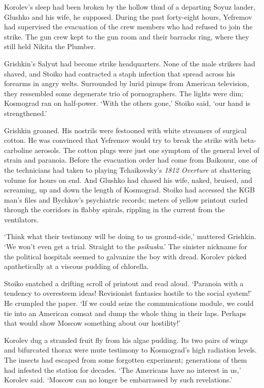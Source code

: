 Korolev's sleep had been broken by the hollow thud of a departing Soyuz lander, Glushko and his wife, he supposed. During the past forty-eight hours, Yefremov had supervised the evacuation of the crew members who had refused to join the strike. The gun crew kept to the gun room and their barracks ring, where they still held Nikita the Plumber.

Grishkin's Salyut had become strike headquarters. None of the male strikers had shaved, and Stoiko had contracted a staph infection that spread across his forearms in angry welts. Surrounded by lurid pinups from American television, they ressembled some degenerate trio of pornographers. The lights were dim; Kosmograd ran on half-power. `With the others gone,' Stoiko said, `our hand is strengthened.'

Grishkin groaned. His nostrils were festooned with white streamers of surgical cotton. He was convinced that Yefremov would try to break the strike with beta-carboline aerosols. The cotton plugs were just one symptom of the general level of strain and paranoia. Before the evacuation order had come from Baikonur, one of the technicians had taken to playing Tchaikovsky's \textit{1812 Overture} at shattering volume for hours on end. And Glushko had chased his wife, naked, bruised, and screaming, up and down the length of Kosmograd. Stoiko had accessed the KGB man's files and Bychkov's psychiatric records; meters of yellow printout curled through the corridors in flabby spirals, rippling in the current from the ventilators.

`Think what their testimony will be doing to us ground-side,' muttered Grishkin. `We won't even get a trial. Straight to the \textit{psikuska}.' The sinister nickname for the political hospitals seemed to galvanize the boy with dread. Korolev picked apathetically at a viscous pudding of chlorella.

Stoiko snatched a drifting scroll of printout and read aloud. `Paranoia with a tendency to overesteem ideas! Revisionist fantasies hostile to the social system!' He crumpled the paper. `If we could seize the communications module, we could tie into an American comsat and dump the whole thing in their laps. Perhaps that would show Moscow something about our hostility!'

Korolev dug a stranded fruit fly from his algae pudding. Its two pairs of wings and bifurcated thorax were mute testimony to Kosmograd's high radiation levels. The insects had escaped from some forgotten experiment; generations of them had infested the station for decades. `The Americans have no interest in us,' Korolev said. `Moscow can no longer be embarrassed by such revelations.'

